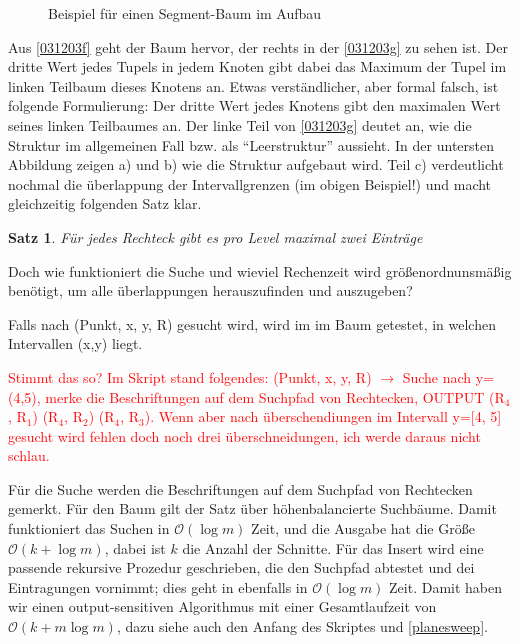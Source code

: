 \documentclass[ngerman,draft,parskip=half*,twoside]{scrreprt}
\theoremstyle{break}
\newtheorem{satz}{Satz}[chapter]
\theoremstyle{nonumberbreak}
\newcommand*{\OO}{\mathcal{O}}      %
\begin{document}
\begin{figure}[H]
\centering
 \hspace{1cm}  \hspace{1cm} 
\caption{Beispiel für einen Segment-Baum im Aufbau}
\label{031203i}

\end{figure}

Aus \autoref{031203f} geht der Baum hervor, der rechts in der \autoref{031203g} zu sehen ist. Der dritte Wert jedes Tupels
in jedem Knoten
gibt dabei das Maximum der Tupel im linken Teilbaum dieses Knotens an. Etwas verständlicher, aber formal falsch, ist folgende
Formulierung: Der dritte Wert jedes Knotens gibt den maximalen Wert seines linken Teilbaumes an.
Der linke Teil von 
\autoref{031203g} deutet an, wie die Struktur im allgemeinen Fall bzw. als "`Leerstruktur"' aussieht. In der untersten Abbildung zeigen a) und
b) wie die Struktur aufgebaut wird. Teil c) verdeutlicht nochmal die überlappung der Intervallgrenzen (im obigen Beispiel!) und macht
gleichzeitig folgenden Satz klar.

\begin{satz}
Für jedes Rechteck gibt es pro Level maximal zwei Einträge
\end{satz} 

Doch wie funktioniert die Suche und wieviel Rechenzeit wird größenordnunsmäßig benötigt, um alle überlappungen herauszufinden und
auszugeben?

Falls nach (Punkt, x, y, R) gesucht wird, wird im im Baum getestet, in welchen Intervallen (x,y) liegt. 

\textcolor{red}{Stimmt das so? Im
Skript stand folgendes: (Punkt, x, y, R) $\rightarrow$ Suche nach y=(4,5), merke die Beschriftungen auf dem Suchpfad von Rechtecken,
OUTPUT (R$_4$, R$_1$) (R$_4$, R$_2$) (R$_4$, R$_3$).
Wenn aber nach überschendiungen im Intervall y=[4, 5] gesucht wird fehlen doch noch drei überschneidungen, ich werde daraus nicht
schlau. }

Für die Suche werden die Beschriftungen auf dem Suchpfad von Rechtecken gemerkt. Für den Baum gilt der Satz über höhenbalancierte
Suchbäume. Damit funktioniert das Suchen in $\OO(\log m)$ Zeit, und die Ausgabe hat die Größe $\OO(k+ \log m)$, dabei ist $k$ die Anzahl
der Schnitte. Für das Insert wird eine passende rekursive Prozedur geschrieben, die den Suchpfad abtestet und dei Eintragungen
vornimmt; dies geht in ebenfalls in $\OO(\log m)$ Zeit.
Damit haben wir einen output-sensitiven Algorithmus mit einer Gesamtlaufzeit von $\OO(k +m \log m)$, dazu siehe auch den Anfang des
Skriptes und \autoref{planesweep}.
\end{document}
